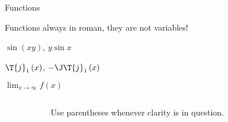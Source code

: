 \documentclass[xcolor=dvipsnames, aspectratio=169, handout, intlimits]{beamer}
\begin{document}
\begin{frame}{Functions}

\vspace{-0.5cm}
Functions always in \textcolor{elmagLight}{roman}, they are not variables!

\vspace{0.25cm}
$\sin \left(xy\right)$, $y \sin x$

$\T{j}_1 \left(x\right)$, $-\J \T{j}_1 \left(x\right)$

$\lim_{x\rightarrow \infty} f \left(x\right)$

\vspace{0.5cm}
\begin{columns}
	\begin{column}{0.1\textwidth}	
		
	\end{column}
	\begin{column}{0.8\textwidth}
		\begin{block}{}
			\centering
			Use parentheses whenever clarity is in question.
		\end{block}			
	\end{column}
	\begin{column}{0.1\textwidth}
		
	\end{column}		
\end{columns}

\end{frame}
\end{document}
